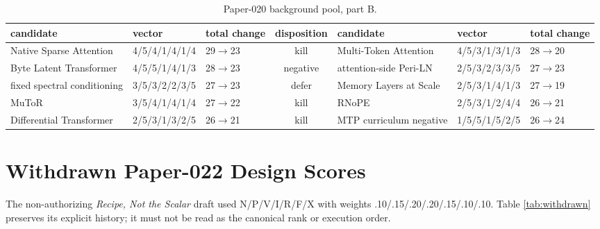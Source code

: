 \documentclass{article}
\begin{document}
\begin{table}[!ht]
\caption{Paper-020 background pool, part B.}
\label{tab:p020poolb}
\centering\tiny
\begin{tabular}{lllclll}
\toprule
candidate & vector & total change & disposition &
candidate & vector & total change\\
\midrule
Native Sparse Attention & 4/5/4/1/4/1/4 & 29$\to$23 & kill &
Multi-Token Attention & 4/5/3/1/3/1/3 & 28$\to$20\\
Byte Latent Transformer & 4/5/5/1/4/1/3 & 28$\to$23 & negative &
attention-side Peri-LN & 2/5/3/2/3/3/5 & 27$\to$23\\
fixed spectral conditioning & 3/5/3/2/2/3/5 & 27$\to$23 & defer &
Memory Layers at Scale & 2/5/3/1/4/1/3 & 27$\to$19\\
MuToR & 3/5/4/1/4/1/4 & 27$\to$22 & kill &
RNoPE & 2/5/3/1/2/4/4 & 26$\to$21\\
Differential Transformer & 2/5/3/1/3/2/5 & 26$\to$21 & kill &
MTP curriculum negative & 1/5/5/1/5/2/5 & 26$\to$24\\
\bottomrule
\end{tabular}
\end{table}

\section{Withdrawn Paper-022 Design Scores}

The non-authorizing \emph{Recipe, Not the Scalar} draft used
N/P/V/I/R/F/X with weights .10/.15/.20/.20/.15/.10/.10.  Table
\ref{tab:withdrawn} preserves its explicit history; it must not be read as the
canonical rank or execution order.
\end{document}
